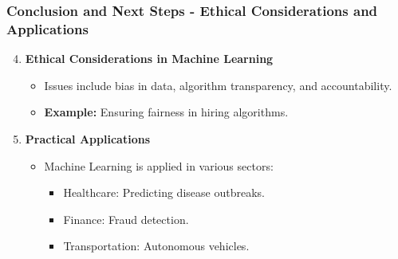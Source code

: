 \documentclass[aspectratio=169]{beamer}
\begin{document}
\begin{frame}[fragile]
    \frametitle{Conclusion and Next Steps - Ethical Considerations and Applications}
    \begin{enumerate}
        \setcounter{enumi}{3}
        \item \textbf{Ethical Considerations in Machine Learning}
        \begin{itemize}
            \item Issues include bias in data, algorithm transparency, and accountability.
            \item \textbf{Example:} Ensuring fairness in hiring algorithms.
        \end{itemize}

        \item \textbf{Practical Applications}
        \begin{itemize}
            \item Machine Learning is applied in various sectors:
            \begin{itemize}
                \item Healthcare: Predicting disease outbreaks.
                \item Finance: Fraud detection.
                \item Transportation: Autonomous vehicles.
            \end{itemize}
        \end{itemize}
    \end{enumerate}
\end{frame}
\end{document}

